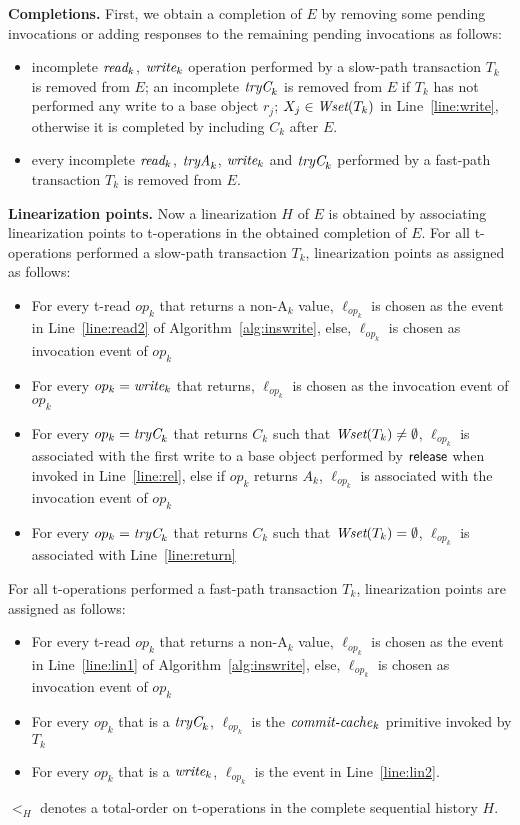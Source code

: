 \vspace{1mm}\noindent\textbf{Completions.}
First, we obtain a completion of $E$ by removing some pending
invocations or adding responses to the remaining pending invocations
as follows:
%
\begin{itemize}
\item
incomplete $\textit{read}_k$, $\textit{write}_k$ operation performed by a slow-path transaction $T_k$ is removed from $E$;
an incomplete $\textit{tryC}_k$ is removed from $E$ if $T_k$ has not performed any write to a base object $r_j$; $X_j \in \textit{Wset}(T_k)$
in Line~\ref{line:write}, otherwise it is completed by including $C_k$ after $E$.
\item
every incomplete $\textit{read}_k$, $\textit{tryA}_k$, $\textit{write}_k$ and $\textit{tryC}_k$ performed by a fast-path transaction $T_k$ is removed from $E$.
\end{itemize}
%
\vspace{1mm}\noindent\textbf{Linearization points.}
Now a linearization $H$ of $E$ is obtained by associating linearization points to
t-operations in the obtained completion of $E$.
For all t-operations performed a slow-path transaction $T_k$, linearization points as assigned as follows:
%
\begin{itemize}
\item For every t-read $op_k$ that returns a non-A$_k$ value, $\ell_{op_k}$ is chosen as the event in Line~\ref{line:read2}
of Algorithm~\ref{alg:inswrite}, else, $\ell_{op_k}$ is chosen as invocation event of $op_k$
\item For every $op_k=\textit{write}_k$ that returns, $\ell_{op_k}$ is chosen as the invocation event of $op_k$
\item For every $op_k=\textit{tryC}_k$ that returns $C_k$ such that $\textit{Wset}(T_k)
  \neq \emptyset$, $\ell_{op_k}$ is associated with the first write to a base object performed by $\lit{release}$
  when invoked in Line~\ref{line:rel}, 
  else if $op_k$ returns $A_k$, $\ell_{op_k}$ is associated with the invocation event of $op_k$
\item For every $op_k=\textit{tryC}_k$ that returns $C_k$ such that $\textit{Wset}(T_k) = \emptyset$, 
$\ell_{op_k}$ is associated with Line~\ref{line:return}
\end{itemize}
%
For all t-operations performed a fast-path transaction $T_k$, linearization points are assigned as follows:
\begin{itemize}
\item For every t-read $op_k$ that returns a non-A$_k$ value, $\ell_{op_k}$ is chosen as the event in Line~\ref{line:lin1}
of Algorithm~\ref{alg:inswrite}, else, $\ell_{op_k}$ is chosen as invocation event of $op_k$
\item
For every $op_k$ that is a $\textit{tryC}_k$, $\ell_{op_k}$ is the $\ms{commit-cache}_k$ primitive invoked by $T_k$
\item
For every $op_k$ that is a $\textit{write}_k$, $\ell_{op_k}$ is the event in Line~\ref{line:lin2}.
\end{itemize}
%
$<_H$ denotes a total-order on t-operations in the complete sequential history $H$.

